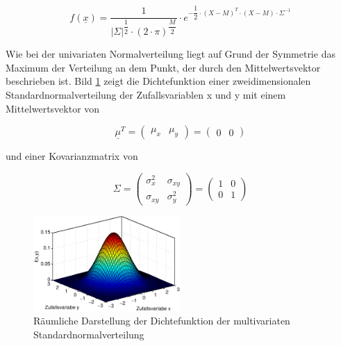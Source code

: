\begin{equation}\label{eq:eightseventynine}
f\left(\underline{x}\right)=\dfrac{1}{\left|\Sigma \right|^{\dfrac{1}{2} } \cdot (2\cdot \pi)^{\dfrac{M}{2}}} \cdot e^{-\dfrac{1}{2} \cdot (X- M)^{T} \cdot (X- M)\cdot \Sigma ^{-1}}
\end{equation}

\noindent Wie bei der univariaten Normalverteilung liegt auf Grund der Symmetrie das Maximum der Verteilung an dem Punkt, der durch den Mittelwertsvektor \underbar{$\mu$} beschrieben ist. Bild \ref{fig:MultivarianteVerteilungen1} zeigt die Dichtefunktion einer zweidimensionalen Standardnormalverteilung der Zufallsvariablen x und y mit einem Mittelwertsvektor von

\begin{equation}\label{eq:eighteighty}
\underline{\mu }^{T} =\left(\begin{array}{cc} {\mu _{x} } & {\mu _{y} } \end{array}\right)=\left(\begin{array}{cc} {0} & {0} \end{array}\right)
\end{equation}

\noindent und einer Kovarianzmatrix von

\begin{equation}\label{eq:eighteightyone}
\Sigma =\left(\begin{array}{cc} {\sigma _{x}^{2} } & {\sigma _{xy}} \\ {\sigma _{xy}} & {\sigma _{y}^{2}} \end{array}\right)=\left(\begin{array}{cc} {1} & {0} \\ {0} & {1} \end{array}\right)
\end{equation}

\noindent 
\begin{figure}[H]
  \centerline{\includegraphics[width=0.5\textwidth]{Kapitel8/Bilder/image10}}
  \caption{R\"{a}umliche Darstellung der Dichtefunktion der multivariaten Standardnormalverteilung}
  \label{fig:MultivarianteVerteilungen1}
\end{figure}

